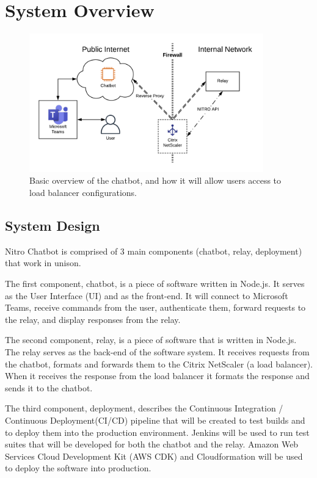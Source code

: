 \documentclass[onecolumn, draftclsnofoot,10pt, compsoc]{IEEEtran}
\begin{document}
\section{System Overview}
\begin{figure}[h]
    \centering
    \captionsetup{format=hang,justification=raggedright,margin=2cm}
    \includegraphics[height=6cm]{overview.png}
    \caption[Basic overview of the chatbot]{Basic overview of the chatbot, and how it will allow users access to load balancer configurations.}
    \label{fig:NetScaler Chatbot}
\end{figure}
\subsection{System Design}
Nitro Chatbot is comprised of 3 main components (chatbot, relay, deployment) that work in unison.

The first component, chatbot, is a piece of software written in Node.js.
It serves as the User Interface (UI) and as the front-end.
It will connect to Microsoft Teams, receive commands from the user, authenticate them, forward requests to the relay, and display responses from the relay.

The second component, relay, is a piece of software that is written in Node.js.
The relay serves as the back-end of the software system.
It receives requests from the chatbot, formats and forwards them to the Citrix NetScaler (a load balancer). 
When it receives the response from the load balancer it formats the response and sends it to the chatbot.

The third component, deployment, describes the Continuous Integration / Continuous Deployment(CI/CD) pipeline that will be created to test builds and to deploy them into the production environment.
Jenkins will be used to run test suites that will be developed for both the chatbot and the relay.
Amazon Web Services Cloud Development Kit (AWS CDK) and Cloudformation will be used to deploy the software into production.
\end{document}
